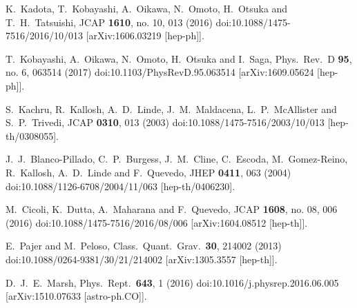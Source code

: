 \documentclass[a4paper,11pt]{article}
\begin{document}
\begin{thebibliography}{99}
  K.~Kadota, T.~Kobayashi, A.~Oikawa, N.~Omoto, H.~Otsuka and T.~H.~Tatsuishi,
  JCAP {\bf 1610}, no. 10, 013 (2016)
  doi:10.1088/1475-7516/2016/10/013
  [arXiv:1606.03219 [hep-ph]].


  T.~Kobayashi, A.~Oikawa, N.~Omoto, H.~Otsuka and I.~Saga,
  Phys.\ Rev.\ D {\bf 95}, no. 6, 063514 (2017)
  doi:10.1103/PhysRevD.95.063514
  [arXiv:1609.05624 [hep-ph]].


  S.~Kachru, R.~Kallosh, A.~D.~Linde, J.~M.~Maldacena, L.~P.~McAllister and S.~P.~Trivedi,
  JCAP {\bf 0310}, 013 (2003)
  doi:10.1088/1475-7516/2003/10/013
  [hep-th/0308055].


  J.~J.~Blanco-Pillado, C.~P.~Burgess, J.~M.~Cline, C.~Escoda, M.~Gomez-Reino, R.~Kallosh, A.~D.~Linde and F.~Quevedo,
  JHEP {\bf 0411}, 063 (2004)
  doi:10.1088/1126-6708/2004/11/063
  [hep-th/0406230].


  M.~Cicoli, K.~Dutta, A.~Maharana and F.~Quevedo,
  JCAP {\bf 1608}, no. 08, 006 (2016)
  doi:10.1088/1475-7516/2016/08/006
  [arXiv:1604.08512 [hep-th]].


  E.~Pajer and M.~Peloso,
  Class.\ Quant.\ Grav.\  {\bf 30}, 214002 (2013)
  doi:10.1088/0264-9381/30/21/214002
  [arXiv:1305.3557 [hep-th]].


  D.~J.~E.~Marsh,
  Phys.\ Rept.\  {\bf 643}, 1 (2016)
  doi:10.1016/j.physrep.2016.06.005
  [arXiv:1510.07633 [astro-ph.CO]].



\end{thebibliography}
\end{document}
